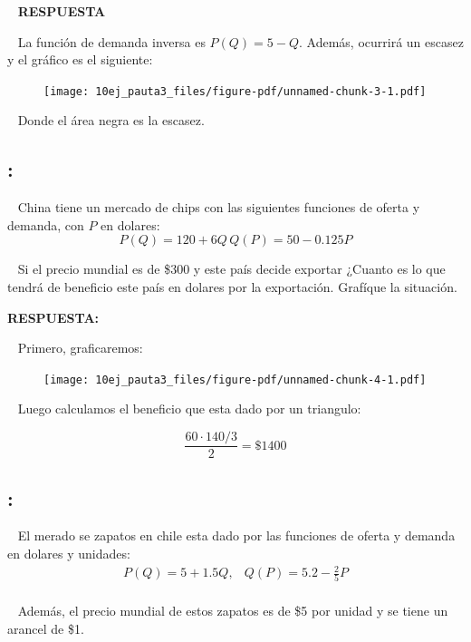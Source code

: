 \documentclass[
  letterpaper,
  DIV=11,
  numbers=noendperiod]{scrreport}
\begin{document}
~ \textbf{RESPUESTA}

~ La función de demanda inversa es \(P(Q)=5-Q\). Además, ocurrirá un
escasez y el gráfico es el siguiente:

\begin{figure}

{\centering \texttt{[image: 10ej\_pauta3\_files/figure-pdf/unnamed-chunk-3-1.pdf]}

}

\end{figure}

~ Donde el área negra es la escasez.

\hypertarget{section-32}{%
\subsection{:}\label{section-32}}

~ China tiene un mercado de chips con las siguientes funciones de oferta
y demanda, con \(P\) en dolares: \[
P(Q)=120+6Q \, Q(P)=50-0.125P
\]

~ Si el precio mundial es de \$300 y este país decide exportar ¿Cuanto
es lo que tendrá de beneficio este país en dolares por la exportación.
Grafíque la situación.

\textbf{RESPUESTA:}

~ Primero, graficaremos:

\begin{figure}

{\centering \texttt{[image: 10ej\_pauta3\_files/figure-pdf/unnamed-chunk-4-1.pdf]}

}

\end{figure}

~ Luego calculamos el beneficio que esta dado por un triangulo:

\[
\frac{60\cdot 140/3}{2}=\$1400
\]

\hypertarget{section-33}{%
\subsection{:}\label{section-33}}

~ El merado se zapatos en chile esta dado por las funciones de oferta y
demanda en dolares y unidades: \[
\begin{array}{cc}P(Q)=5+1.5Q, & Q(P)=5.2-\frac{2}{5}P\\\end{array}
\]

~ Además, el precio mundial de estos zapatos es de \$5 por unidad y se
tiene un arancel de \$1.
\end{document}
